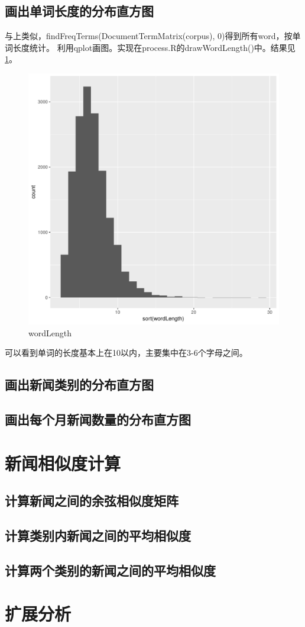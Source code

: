 \documentclass[12pt]{article}
\begin{document}
\subsection{画出单词长度的分布直方图}
与上类似，findFreqTerms(DocumentTermMatrix(corpus), 0)得到所有word，按单词长度统计。
利用qplot画图。实现在process.R的drawWordLength()中。结果见\ref{fig:wordLength}。
\begin{figure}[htbp]
\centering
\includegraphics[width=1.0\textwidth]{../result/wordLength.pdf}
\caption{wordLength}
\label{fig:wordLength}
\end{figure}
可以看到单词的长度基本上在10以内，主要集中在3-6个字母之间。

\subsection{画出新闻类别的分布直方图}
\subsection{画出每个月新闻数量的分布直方图}


\section{新闻相似度计算}
\subsection{计算新闻之间的余弦相似度矩阵}
\subsection{计算类别内新闻之间的平均相似度}
\subsection{计算两个类别的新闻之间的平均相似度}

\section{扩展分析}
\end{document}
